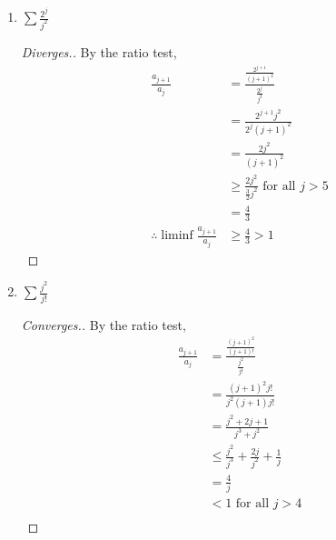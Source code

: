 \documentclass{article}
\begin{document}
\begin{enumerate}
\begin{enumerate}
                  \item $\sum\frac{2^j}{j^2}$
                        \begin{proof}[Diverges.]
                              By the ratio test,
                              \begin{align*}
                                    \frac{a_{j+1}}{a_j}                    & = \frac{\frac{2^{j+1}}{(j+1)^2}}{\frac{2^j}{j^2}}        \\
                                                                           & = \frac{2^{j+1}j^2}{2^j(j+1)^2}                          \\
                                                                           & = \frac{2j^2}{(j+1)^2}                                   \\
                                                                           & \geq \frac{2j^2}{\frac{3}{2}j^2} \textrm{ for all $j>5$} \\
                                                                           & = \frac{4}{3}                                            \\
                                    \therefore \liminf \frac{a_{j+1}}{a_j} & \geq \frac{4}{3} > 1
                              \end{align*}
                        \end{proof}
                  \item $\sum\frac{j^2}{j!}$
                        \begin{proof}[Converges.]
                              By the ratio test,
                              \begin{align*}
                                    \frac{a_{j+1}}{a_j}                  & = \frac{\frac{(j+1)^2}{(j+1)!}}{\frac{j^2}{j!}} \\
                                                                         & = \frac{(j+1)^2j!}{j^2(j+1)j!}                  \\
                                                                         & = \frac{j^2+2j+1}{j^3+j^2}                      \\
                                                                         & \leq \frac{j^2}{j^3}+\frac{2j}{j^2}+\frac{1}{j} \\
                                                                         & = \frac{4}{j}                                   \\
                                                                         & < 1 \textrm{ for all $j>4$}                     \\

\end{align*}
\end{proof}
\end{enumerate}
\end{enumerate}
\end{document}
